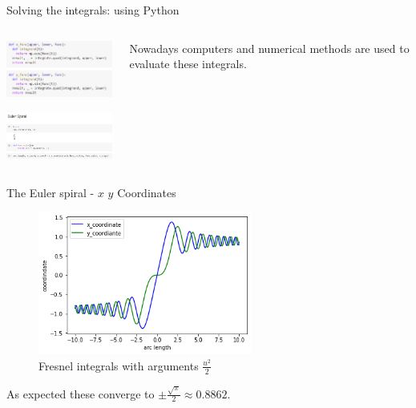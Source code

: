 \documentclass{beamer}
\begin{document}
\begin{frame}{Solving the integrals: using Python}
	\begin{columns}
		\begin{column}{0.5\textwidth}
			\includegraphics[width=50mm, scale=0.5]{code_1.png}
			
			\includegraphics[width=50mm, scale=0.5]{code_2.png}
		\end{column}
		\begin{column}{0.5\textwidth}
		Nowadays computers and numerical methods are used to evaluate these integrals.
			
		\end{column}
	\end{columns}
\end{frame}

\begin{frame}{The Euler spiral - $x$ $y$ Coordinates}
	\begin{figure}
		\caption{Fresnel integrals with arguments $\frac{u^2}{2}$}
		\centering
		\includegraphics[width=70mm, scale=0.5]{euler_x_vs_y.png}
	\end{figure}
	As expected these converge to $\pm \frac{\sqrt{\pi}}{2} \approx 0.8862$.
\end{frame}
\end{document}
